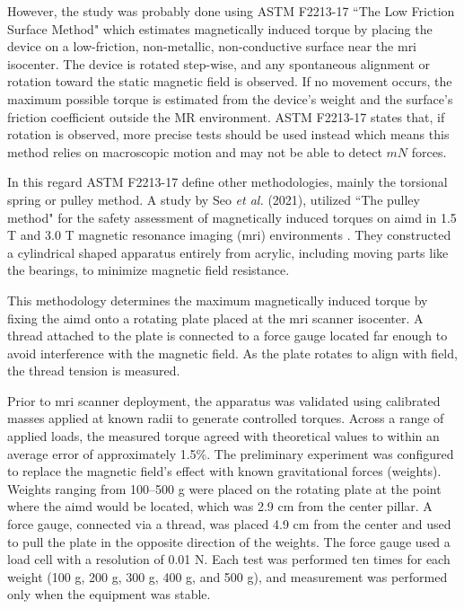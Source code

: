 However, the study was probably done using ASTM F2213-17 ``The Low Friction Surface Method" which estimates magnetically induced torque by placing the device on a low-friction, non-metallic, non-conductive surface near the \gls{mri} isocenter. The device is rotated step-wise, and any spontaneous alignment or rotation toward the static magnetic field is observed. If no movement occurs, the maximum possible torque is estimated from the device’s weight and the surface’s friction coefficient outside the MR environment. ASTM F2213-17 states that, if rotation is observed, more precise tests should be used instead which means this method relies on macroscopic motion and may not be able to detect $mN$ forces. 

In this regard ASTM F2213-17 define other methodologies, mainly the torsional spring or pulley method. A study by Seo \textit{et al.} (2021), utilized ``The pulley method" for the safety assessment of magnetically induced torques on \gls{aimd} in 1.5 T and 3.0 T magnetic resonance imaging (\gls{mri}) environments \cite{Seo2021767}. They constructed a cylindrical shaped apparatus entirely from acrylic, including moving parts like the bearings, to minimize magnetic field resistance. 

This methodology determines the maximum magnetically induced torque by fixing the \gls{aimd} onto a rotating plate placed at the \gls{mri} scanner isocenter. A thread attached to the plate is connected to a force gauge located far enough to avoid interference with the magnetic field. As the plate rotates to align with field, the thread tension is measured.

Prior to \gls{mri} scanner deployment, the apparatus was validated using calibrated masses applied at known radii to generate controlled torques. Across a range of applied loads, the measured torque agreed with theoretical values to within an average error of approximately 1.5\%. The preliminary experiment was configured to replace the magnetic field's effect with known gravitational forces (weights). Weights ranging from 100–500 g were placed on the rotating plate at the point where the \gls{aimd} would be located, which was 2.9 cm from the center pillar. A force gauge, connected via a thread, was placed 4.9 cm from the center and used to pull the plate in the opposite direction of the weights. The force gauge used a load cell with a resolution of 0.01 N. Each test was performed ten times for each weight (100 g, 200 g, 300 g, 400 g, and 500 g), and measurement was performed only when the equipment was stable. 

